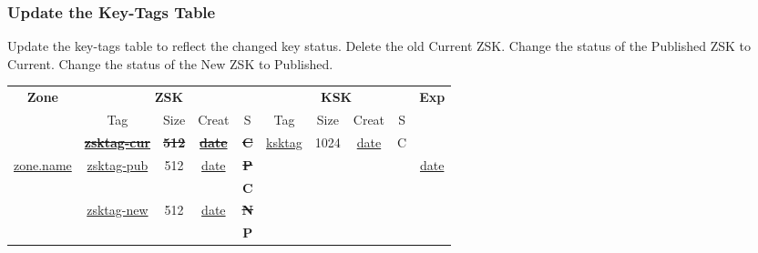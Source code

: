 
\subsubsection{Update the Key-Tags Table}

Update the key-tags table to reflect the changed key status.  Delete the old
Current ZSK. Change the status of the Published ZSK to Current.  Change the
status of the New ZSK to Published.

\begin{center}
\begin{tabular}{|c|c|c|c|c|c|c|c|c|c|}
\hline
{\bf Zone} &
\multicolumn{4}{c|}{{\bf ZSK}} &
\multicolumn{4}{c|}{{\bf KSK}} &
{\bf Exp} \\
\cline{2-9}

 & Tag & Size & Creat & S & Tag & Size & Creat & S & \\
\hline

					&
{\bf \sout{\underline{zsktag-cur}}}	&
{\bf \sout{512}}			&
{\bf \sout{\underline{date}}}		&
{\bf \sout{C}}				&
\underline{ksktag}			&
1024					&
\underline{date}			&
C					&
					\\

\cline{2-9}

\underline{zone.name}	&
\underline{zsktag-pub}	&
512			&
\underline{date}	&
{\bf \sout{P}}		&
& & & &
\underline{date}			\\

			&
			&
			&
			&
{\bf C}			&
& & & & \\

\cline{2-9}

			&
\underline{zsktag-new}	&
512			&
\underline{date}	&
{\bf \sout{N}}		&
& & & & \\

			&
			&
			&
			&
{\bf P}			&
& & & & \\

\hline
\end{tabular}
\end{center}

